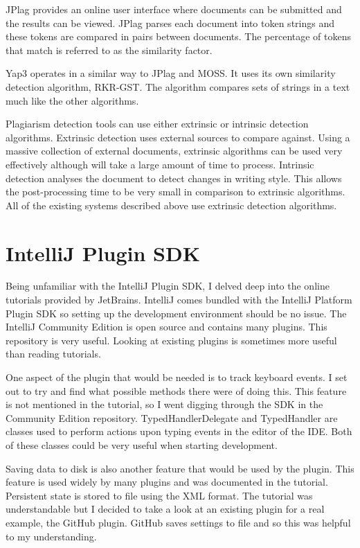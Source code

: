 JPlag provides an online user interface where documents can be submitted and the results can be viewed. JPlag parses each document into token strings and these tokens are compared in pairs between documents. The percentage of tokens that match is referred to as the similarity factor\cite{Prechelt2003}. 

Yap3 operates in a similar way to JPlag and MOSS. It uses its own similarity detection algorithm, RKR-GST. The algorithm compares sets of strings in a text much like the other algorithms\cite{Wise1996}.

Plagiarism detection tools can use either extrinsic or intrinsic detection algorithms. Extrinsic detection uses external sources to compare against. Using a massive collection of external documents, extrinsic algorithms can be used very effectively although will take a large amount of time to process. Intrinsic detection analyses the document to detect changes in writing style. This allows the post-processing time to be very small in comparison to extrinsic algorithms. All of the existing systems described above use extrinsic detection algorithms.

\section{IntelliJ Plugin SDK}
Being unfamiliar with the IntelliJ Plugin SDK, I delved deep into the online tutorials provided by JetBrains\cite{IntelliJGettingStarted}. IntelliJ comes bundled with the IntelliJ Platform Plugin SDK so setting up the development environment should be no issue. The IntelliJ Community Edition is open source and contains many plugins\cite{IntelliJGitHub}. This repository is very useful. Looking at existing plugins is sometimes more useful than reading tutorials.

One aspect of the plugin that would be needed is to track keyboard events. I set out to try and find what possible methods there were of doing this. This feature is not mentioned in the tutorial, so I went digging through the SDK in the Community Edition repository. TypedHandlerDelegate and TypedHandler are classes used to perform actions upon typing events in the editor of the IDE. Both of these classes could be very useful when starting development.

Saving data to disk is also another feature that would be used by the plugin. This feature is used widely by many plugins and was documented in the tutorial. Persistent state is stored to file using the XML format. The tutorial was understandable but I decided to take a look at an existing plugin for a real example, the GitHub plugin. GitHub saves settings to file and so this was helpful to my understanding.

